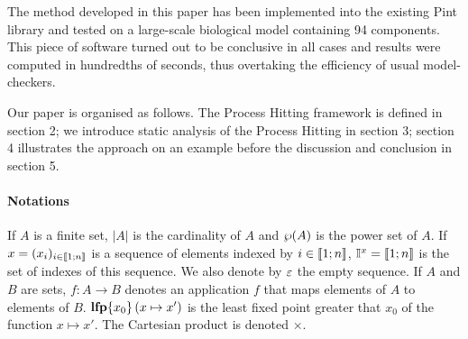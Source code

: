 The method developed in this paper has been implemented into the existing Pint library and tested on a large-scale biological model containing 94 components.
This piece of software turned out to be conclusive in all cases and results were computed in hundredths of seconds,
thus overtaking the efficiency of usual model-checkers.



Our paper is organised as follows.
The Process Hitting framework is defined in section 2;
we introduce static analysis of the Process Hitting in section 3;
section 4 illustrates the approach on an example
before the discussion and conclusion in section 5. 



\paragraph*{Notations}

If $A$ is a finite set,
$|A|$ is the cardinality of $A$
and $\wp(A)$ is the power set of $A$.
If $x = (x_i)_{i \in \llbracket 1; n \rrbracket}$ is a sequence of elements indexed by $i \in \llbracket 1; n \rrbracket$,
$\mathbb{I}^{x} = \llbracket 1; n \rrbracket$ is the set of indexes of this sequence.
We also denote by $\varepsilon$ the empty sequence.
If $A$ and $B$ are sets,
$f : A \rightarrow B$ denotes an application $f$ that maps elements of $A$ to elements of $B$.
$\mathbf{lfp}\{x_0\}\left(x\mapsto x'\right)$ is the least fixed point greater that $x_0$ of the function $x \mapsto x'$.
The Cartesian product is denoted $\times$.
